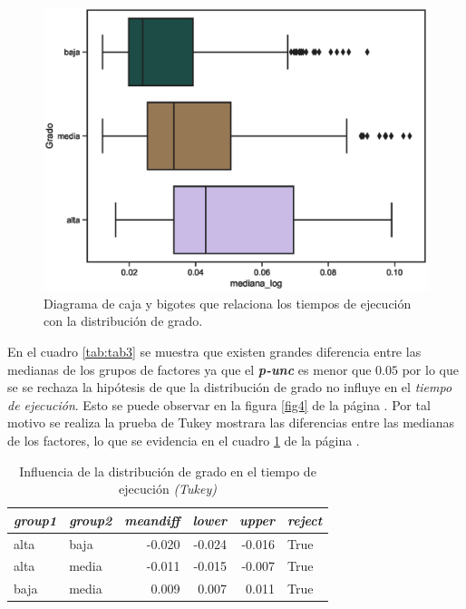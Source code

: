 \documentclass{article}
\begin{document}
\begin{center}
\begin{figure}[htbp]
\includegraphics[scale=0.6]{boxplot_Grado.eps}
\caption{Diagrama de caja y bigotes que relaciona los tiempos de ejecución con la distribución de grado.}
\label{fig13}
\end{figure}
\end{center}

En el cuadro \ref{tab:tab3} se muestra que existen grandes diferencia entre las medianas de los grupos de factores ya que el \textbf{\emph{p-unc}} es menor que $0.05$ por lo que se se rechaza la hipótesis de que la distribución de grado no influye en el \textit{tiempo de ejecución}. Esto se puede observar en la figura \ref{fig4} de la página \pageref{fig4}. Por tal motivo se realiza la prueba de Tukey mostrara las diferencias entre las medianas de los factores, lo que se evidencia en el cuadro \ref{tab:t4} de la página \pageref{tab:t4}.
\begin{table}[htbp]
  \centering
  \caption{Influencia de la distribución de grado en el tiempo de ejecución \textit{(Tukey)}}
    \begin{tabular}{llrrrl}
    \toprule
    \textit{\textbf{group1}} & \textit{\textbf{group2}} & \multicolumn{1}{l}{\textit{\textbf{meandiff}}} & \multicolumn{1}{l}{\textit{\textbf{lower}}} & \multicolumn{1}{l}{\textit{\textbf{upper}}} & \textit{\textbf{reject}} \\
    \midrule
    alta  & baja  & -0.020 & -0.024 & -0.016 & True \\
    alta  & media & -0.011 & -0.015 & -0.007 & True \\
    baja  & media & 0.009 & 0.007 & 0.011 & True \\
    \bottomrule
    \end{tabular}%
  \label{tab:t4}%
\end{table}%
\end{document}
